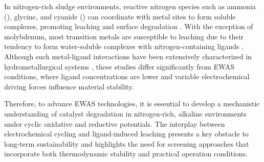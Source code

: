 \documentclass[journal=jacsat,manuscript=article]{achemso}
\begin{document}
In nitrogen-rich sludge environments, reactive nitrogen species such as ammonia (), glycine, and cyanide () can coordinate with metal sites to form soluble complexes, promoting leaching and surface degradation \cite{Bjerrum1957StabilitySubstances, Meng1996PrinciplesReview, Wang2022AmmoniaSystem}. With the exception of molybdenum, most transition metals are susceptible to leaching due to their tendency to form water-soluble complexes with nitrogen-containing ligands \cite{Meng1996PrinciplesReview, Ma2021ALeaching, Wang2020Reduction-ammoniacalSalts, Li2025Glycine-mediatedStudy}. Although such metal-ligand interactions have been extensively characterized in hydrometallurgical systems \cite{Han1974AMMONIA-AMMONIUMNODULES, Bhuntumkomol1982TheSolutions, Azadi2021SustainableGlycine, Oraby2020GoldPermanganate, Sarvar2023ApplicationStructure, SPARROW1995CyanideApplications, Akcil2015PreciousReview, Wang2022AmmoniaSystem, Ma2021ALeaching, Wang2020Reduction-ammoniacalSalts, Li2025Glycine-mediatedStudy}, these studies differ significantly from EWAS conditions, where ligand concentrations are lower and variable electrochemical driving forces influence material stability.

Therefore, to advance EWAS technologies, it is essential to develop a mechanistic understanding of catalyst degradation in nitrogen-rich, alkaline environments under cyclic oxidative and reductive potentials. The interplay between electrochemical cycling and ligand-induced leaching presents a key obstacle to long-term sustainability and highlights the need for screening approaches that incorporate both thermodynamic stability and practical operation conditions.





\end{document}
